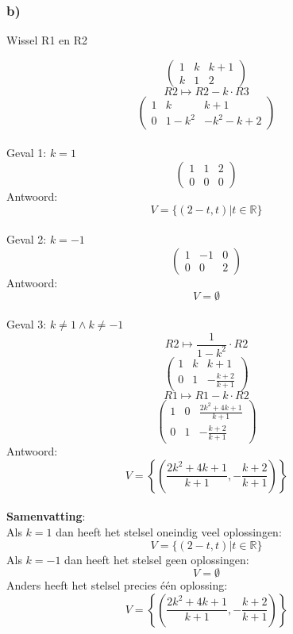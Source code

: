 \documentclass[10pt,a4paper]{article}
\begin{document}
\subsubsection*{b)}
\begin{center}
Wissel R1 en R2
\end{center}
\[
\begin{pmatrix}
1 &  k &  k+1\\
k &  1 &  2
\end{pmatrix}
\]
\[ R2 \longmapsto R2 - k\cdot R3\]
\[
\begin{pmatrix}
1 &  k &  k+1\\
0 &  1-k^2 &  -k^2-k+2
\end{pmatrix}
\]\\
Geval 1: $k=1$\\
\[
\begin{pmatrix}
1 &  1 &  2\\
0 &  0 &  0
\end{pmatrix}
\]
Antwoord:
\[
V=\{(2-t,t) | t \in \mathbb{R}\}
\]\\
Geval 2: $k=-1$\\
\[
\begin{pmatrix}
1 & -1 &  0\\
0 &  0 &  2
\end{pmatrix}
\]
Antwoord:
\[
V=\emptyset
\]\\
Geval 3: $k\neq 1 \wedge k\neq -1$\\
\[ R2 \longmapsto \frac{1}{1-k^2}\cdot R2 \]
\[
\begin{pmatrix}
1 &  k &  k+1\\
0 &  1 &  -\frac{k+2}{k+1}
\end{pmatrix}
\]
\[ R1 \longmapsto R1-k\cdot R2 \]
\[
\begin{pmatrix}
1 &  0 &  \frac{2k^2+4k+1}{k+1}\\
0 &  1 &  -\frac{k+2}{k+1}
\end{pmatrix}
\]
Antwoord:
\[
V=\left\lbrace\left(\frac{2k^2+4k+1}{k+1},-\frac{k+2}{k+1}\right)\right\rbrace
\]\\
\textbf{Samenvatting}:\\
Als $k=1$ dan heeft het stelsel oneindig veel oplossingen:
\[
V=\{(2-t,t) | t \in \mathbb{R}\}
\]
Als $k=-1$ dan heeft het stelsel geen oplossingen:
\[
V=\emptyset
\]
Anders heeft het stelsel precies één oplossing:
\[
V=\left\lbrace\left(\frac{2k^2+4k+1}{k+1},-\frac{k+2}{k+1}\right)\right\rbrace
\]
\end{document}
